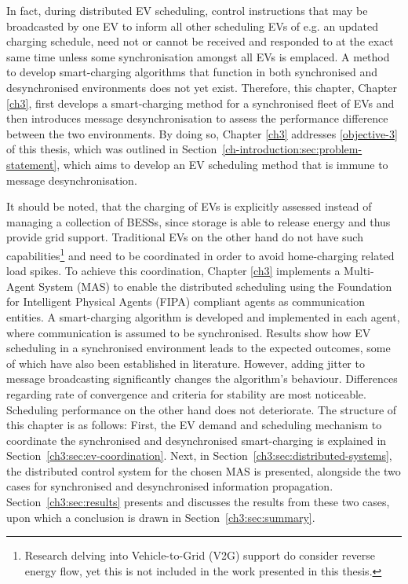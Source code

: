 In fact, during distributed EV scheduling, control instructions that may be broadcasted by one EV to inform all other scheduling EVs of e.g. an updated charging schedule, need not or cannot be received and responded to at the exact same time unless some synchronisation amongst all EVs is emplaced.
A method to develop smart-charging algorithms that function in both synchronised and desynchronised environments does not yet exist.
Therefore, this chapter, Chapter \ref{ch3}, first develops a smart-charging method for a synchronised fleet of EVs and then introduces message desynchronisation to assess the performance difference between the two environments.
By doing so, Chapter \ref{ch3} addresses \ref{objective-3} of this thesis, which was outlined in Section~\ref{ch-introduction:sec:problem-statement}, which aims to develop an EV scheduling method that is immune to message desynchronisation.

It should be noted, that the charging of EVs is explicitly assessed instead of managing a collection of BESSs, since storage is able to release energy and thus provide grid support.
Traditional EVs on the other hand do not have such capabilities\footnote{Research delving into Vehicle-to-Grid (V2G) support do consider reverse energy flow, yet this is not included in the work presented in this thesis.} and need to be coordinated in order to avoid home-charging related load spikes.
To achieve this coordination, Chapter \ref{ch3} implements a Multi-Agent System (MAS) to enable the distributed scheduling using the Foundation for Intelligent Physical Agents (FIPA) compliant agents as communication entities.
A smart-charging algorithm is developed and implemented in each agent, where communication is assumed to be synchronised.
Results show how EV scheduling in a synchronised environment leads to the expected outcomes, some of which have also been established in literature.
However, adding jitter to message broadcasting significantly changes the algorithm's behaviour.
Differences regarding rate of convergence and criteria for stability are most noticeable.
Scheduling performance on the other hand does not deteriorate.
The structure of this chapter is as follows:
First, the EV demand and scheduling mechanism to coordinate the synchronised and desynchronised smart-charging is explained in Section~\ref{ch3:sec:ev-coordination}.
Next, in Section~\ref{ch3:sec:distributed-systems}, the distributed control system for the chosen MAS is presented, alongside the two cases for synchronised and desynchronised information propagation.
Section~\ref{ch3:sec:results} presents and discusses the results from these two cases, upon which a conclusion is drawn in Section~\ref{ch3:sec:summary}.
